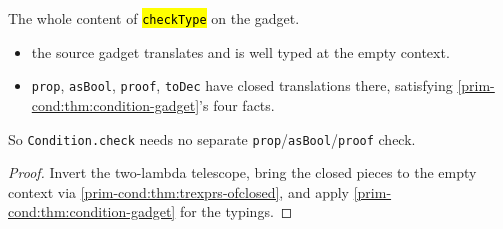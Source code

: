 \begin{theorem}
  \label{prim-cond:thm:condition-gadget-pieces}
  \leanok

   The whole content of \hl{\texttt{checkType}} on the gadget.
  \begin{itemize}
  \item {} the source gadget translates and is well typed at the empty context.
  \item {} \texttt{prop}, \texttt{asBool}, \texttt{proof}, \texttt{toDec} have closed
    translations there, satisfying \ref{prim-cond:thm:condition-gadget}'s four facts.
  \end{itemize}
  So \texttt{Condition.check} needs no separate \texttt{prop}/\texttt{asBool}/\texttt{proof} check.
\end{theorem}
\begin{proof}
  \leanok
   Invert the two-lambda telescope, bring the closed pieces to the empty context via
  \ref{prim-cond:thm:trexprs-ofclosed}, and apply \ref{prim-cond:thm:condition-gadget} for the
  typings.
\end{proof}

